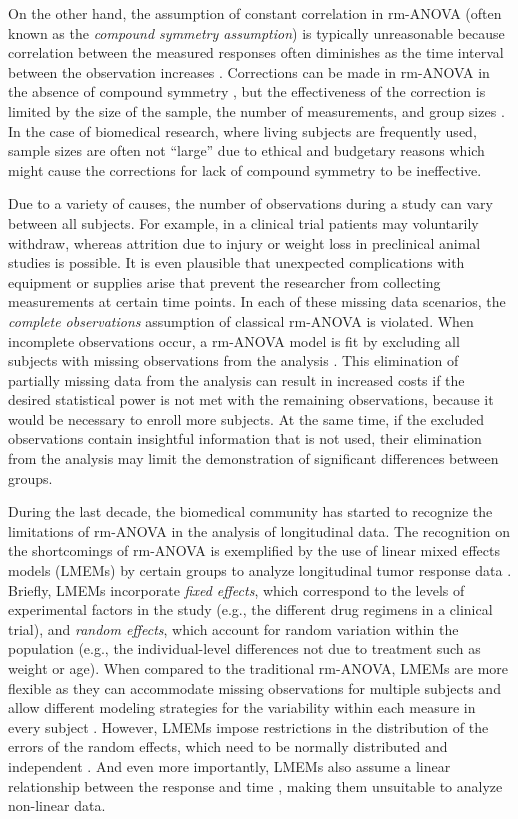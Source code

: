 \documentclass[Royal,times,sagev]{sagej}
\begin{document}
On the other hand, the assumption of constant correlation in rm-ANOVA
(often known as the \emph{compound symmetry assumption}) is typically
unreasonable because correlation between the measured responses often
diminishes as the time interval between the observation increases
\citep{ugrinowitsch2004}. Corrections can be made in rm-ANOVA in the
absence of compound symmetry \citep{huynh1976, greenhouse1959}, but the
effectiveness of the correction is limited by the size of the sample,
the number of measurements\citep{haverkamp2017}, and group sizes
\citep{keselman2001}. In the case of biomedical research, where living
subjects are frequently used, sample sizes are often not ``large'' due
to ethical and budgetary reasons \citep{charan2013} which might cause
the corrections for lack of compound symmetry to be ineffective.

Due to a variety of causes, the number of observations during a study
can vary between all subjects. For example, in a clinical trial patients
may voluntarily withdraw, whereas attrition due to injury or weight loss
in preclinical animal studies is possible. It is even plausible that
unexpected complications with equipment or supplies arise that prevent
the researcher from collecting measurements at certain time points. In
each of these missing data scenarios, the \emph{complete observations}
assumption of classical rm-ANOVA is violated. When incomplete
observations occur, a rm-ANOVA model is fit by excluding all subjects
with missing observations from the analysis \citep{gueorguieva2004}.
This elimination of partially missing data from the analysis can result
in increased costs if the desired statistical power is not met with the
remaining observations, because it would be necessary to enroll more
subjects. At the same time, if the excluded observations contain
insightful information that is not used, their elimination from the
analysis may limit the demonstration of significant differences between
groups.

During the last decade, the biomedical community has started to
recognize the limitations of rm-ANOVA in the analysis of longitudinal
data. The recognition on the shortcomings of rm-ANOVA is exemplified by
the use of linear mixed effects models (LMEMs) by certain groups to
analyze longitudinal tumor response data
\citep{skala2010, vishwanath2009}. Briefly, LMEMs incorporate
\emph{fixed effects}, which correspond to the levels of experimental
factors in the study (e.g., the different drug regimens in a clinical
trial), and \emph{random effects}, which account for random variation
within the population (e.g., the individual-level differences not due to
treatment such as weight or age). When compared to the traditional
rm-ANOVA, LMEMs are more flexible as they can accommodate missing
observations for multiple subjects and allow different modeling
strategies for the variability within each measure in every subject
\citep{pinheiro2006}. However, LMEMs impose restrictions in the
distribution of the errors of the random effects, which need to be
normally distributed and independent \citep{gueorguieva2004, barr2013}.
And even more importantly, LMEMs also assume a linear relationship
between the response and time \citep{pinheiro2006}, making them
unsuitable to analyze non-linear data.
\end{document}
